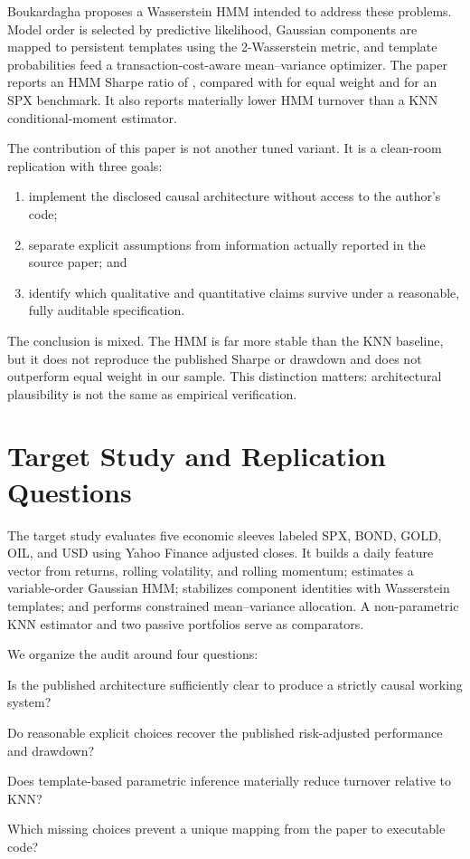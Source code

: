 \documentclass[11pt]{article}
\begin{document}
Boukardagha \cite{boukardagha2026} proposes a Wasserstein HMM intended to address these problems. Model order is selected by predictive likelihood, Gaussian components are mapped to persistent templates using the 2-Wasserstein metric, and template probabilities feed a transaction-cost-aware mean--variance optimizer. The paper reports an HMM Sharpe ratio of \PubHMMSharpe{}, compared with \PubEqualSharpe{} for equal weight and \PubSPXSharpe{} for an SPX benchmark. It also reports materially lower HMM turnover than a KNN conditional-moment estimator.

The contribution of this paper is not another tuned variant. It is a clean-room replication with three goals:

\begin{enumerate}
  \item implement the disclosed causal architecture without access to the author's code;
  \item separate explicit assumptions from information actually reported in the source paper; and
  \item identify which qualitative and quantitative claims survive under a reasonable, fully auditable specification.
\end{enumerate}

The conclusion is mixed. The HMM is far more stable than the KNN baseline, but it does not reproduce the published Sharpe or drawdown and does not outperform equal weight in our sample. This distinction matters: architectural plausibility is not the same as empirical verification.

\section{Target Study and Replication Questions}

The target study evaluates five economic sleeves labeled SPX, BOND, GOLD, OIL, and USD using Yahoo Finance adjusted closes. It builds a daily feature vector from returns, rolling volatility, and rolling momentum; estimates a variable-order Gaussian HMM; stabilizes component identities with Wasserstein templates; and performs constrained mean--variance allocation. A non-parametric KNN estimator and two passive portfolios serve as comparators.

We organize the audit around four questions:

\begin{description}[style=nextline]
  \item[RQ1: Implementability.] Is the published architecture sufficiently clear to produce a strictly causal working system?
  \item[RQ2: Numerical reproducibility.] Do reasonable explicit choices recover the published risk-adjusted performance and drawdown?
  \item[RQ3: Stability.] Does template-based parametric inference materially reduce turnover relative to KNN?
  \item[RQ4: Identification.] Which missing choices prevent a unique mapping from the paper to executable code?
\end{description}
\end{document}
